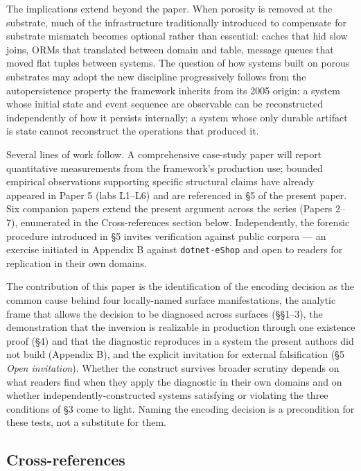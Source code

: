 \documentclass[
]{article}
\let\origtexttt\texttt%
\renewcommand{\texttt}[1]{\origtexttt{\seqsplit{#1}}}%
\let\texttt\origtexttt%
\begin{document}
The implications extend beyond the paper. When porosity is removed at
the substrate, much of the infrastructure traditionally introduced to
compensate for substrate mismatch becomes optional rather than
essential: caches that hid slow joins, ORMs that translated between
domain and table, message queues that moved flat tuples between systems.
The question of how systems built on porous substrates may adopt the new
discipline progressively follows from the autopersistence property the
framework inherits from its 2005 origin: a system whose initial state
and event sequence are observable can be reconstructed independently of
how it persists internally; a system whose only durable artifact is
state cannot reconstruct the operations that produced it.

Several lines of work follow. A comprehensive case-study paper will
report quantitative measurements from the framework's production use;
bounded empirical observations supporting specific structural claims
have already appeared in Paper 5 (labs L1--L6) and are referenced in §5
of the present paper. Six companion papers extend the present argument
across the series (Papers 2--7), enumerated in the Cross-references
section below. Independently, the forensic procedure introduced in §5
invites verification against public corpora --- an exercise initiated in
Appendix B against \texttt{dotnet-eShop} and open to readers for
replication in their own domains.

The contribution of this paper is the identification of the encoding
decision as the common cause behind four locally-named surface
manifestations, the analytic frame that allows the decision to be
diagnosed across surfaces (§§1--3), the demonstration that the inversion
is realizable in production through one existence proof (§4) and that
the diagnostic reproduces in a system the present authors did not build
(Appendix B), and the explicit invitation for external falsification (§5
\emph{Open invitation}). Whether the construct survives broader scrutiny
depends on what readers find when they apply the diagnostic in their own
domains and on whether independently-constructed systems satisfying or
violating the three conditions of §3 come to light. Naming the encoding
decision is a precondition for these tests, not a substitute for them.

\subsection{Cross-references}\label{cross-references}
\end{document}
